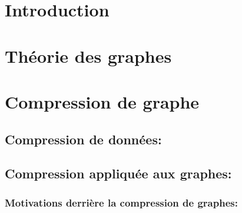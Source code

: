 \documentclass[11pt,a4paper]{report}
\theoremstyle{definition}
\begin{document}







\tableofcontents
\newpage

\listoffigures
{}
\cleardoublepage


\listoftables
{}
\cleardoublepage



\chapter{Introduction} 


	\chapter{ Théorie des graphes}
	  
	

	\chapter{Compression de graphe}
	
		\section{Compression de données: }
			
			
		
		\section{Compression appliquée aux graphes:}
	
			\subsection{Motivations derrière la compression de graphes: }
	
\end{document}
